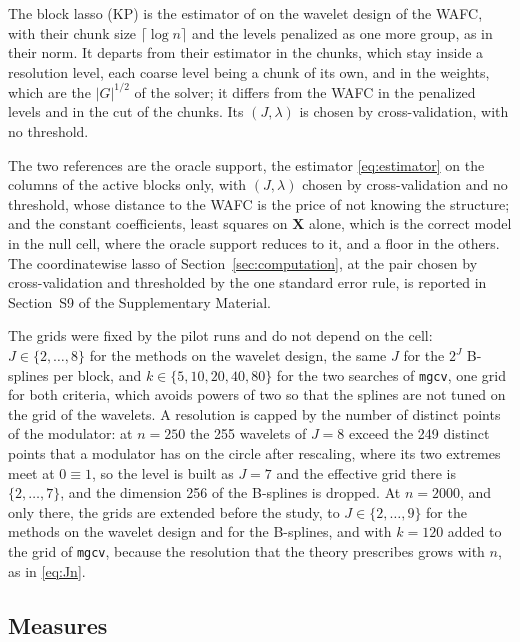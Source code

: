 \documentclass[12pt]{article} %
\theoremstyle{definition}
\theoremstyle{plain}
\newcommand{\bX}{\mathbf{X}}
\newcommand{\pen}{\lambda}
\begin{document}
{The block lasso (KP) is the estimator of \citet{Klopp-Pensky-2015} on the
wavelet design of the WAFC, with their chunk size $\lceil\log n\rceil$ and the
levels penalized as one more group, as in their norm. It departs from their
estimator in the chunks, which stay inside a resolution level, each coarse
level being a chunk of its own, and in the weights, which are the $|G|^{1/2}$
of the solver; it differs from the WAFC in the penalized levels and in the
cut of the chunks. Its $(J,\pen)$ is chosen by cross-validation, with no
threshold.

The two references are the oracle support, the estimator
\eqref{eq:estimator} on the columns of the active blocks only, with $(J,\pen)$
chosen by cross-validation and no threshold, whose distance to the WAFC is the
price of not knowing the structure; and the constant coefficients, least
squares on $\bX$ alone, which is the correct model in the null cell, where the
oracle support reduces to it, and a floor in the others. The coordinatewise
lasso of Section~\ref{sec:computation}, at the pair chosen by
cross-validation and thresholded by the one standard error rule, is reported
in Section~S9 of the Supplementary Material.

The grids were fixed by the pilot runs and do not depend on the cell:
$J \in \{2,\dots,8\}$ for the methods on the wavelet design, the same $J$ for
the $2^J$ B-splines per block, and $k \in \{5, 10, 20, 40, 80\}$ for the two
searches of \texttt{mgcv}, one grid for both criteria, which avoids powers of
two so that the splines are not tuned on the grid of the wavelets. A
resolution is capped by the number of distinct points of the modulator: at
$n = 250$ the 255 wavelets of $J = 8$ exceed the 249 distinct points that a
modulator has on the circle after rescaling, where its two extremes meet at
$0 \equiv 1$, so the level is built as $J = 7$ and the effective grid there
is $\{2,\dots,7\}$, and the dimension 256 of the B-splines is dropped. At
$n = 2000$, and only there, the grids are extended before the study, to
$J \in \{2,\dots,9\}$ for the methods on the wavelet design and for the
B-splines, and with $k = 120$ added to the grid of \texttt{mgcv}, because the
resolution that the theory prescribes grows with $n$, as in \eqref{eq:Jn}.

\subsection{Measures}
\label{sec:sim-measures}

}
\end{document}

